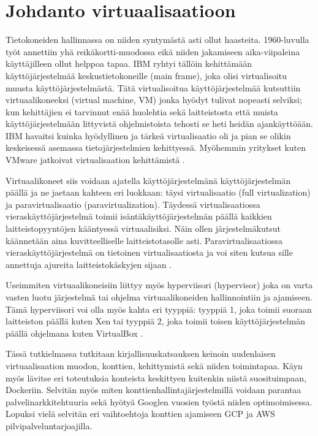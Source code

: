 \documentclass[finnish,gradu]{tktltiki3}
\begin{document}
    \section{Johdanto virtuaalisaatioon}
    
    Tietokoneiden hallinnassa on niiden syntymästä asti ollut haasteita. 1960-luvulla työt annettiin yhä reikäkortti-muodossa eikä niiden jakamiseen aika-viipaleina käyttäjilleen ollut helppoa tapaa. IBM ryhtyi tällöin kehittämään käyttöjärjestelmää keskustietokoneille (main frame), joka olisi virtualisoitu muusta käyttöjärjestelmästä. Tätä virtualisoitua käyttöjärjestelmää kutsuttiin virtuaalikoneeksi (virtual machine, VM) jonka hyödyt tulivat nopeasti selviksi; kun kehittäjien ei tarvinnut enää huolehtia sekä laitteistosta että muista käyttöjärjestelmään littyvistä ohjelmistoista tehosti se heti heidän ajankäyttöään. IBM havaitsi kuinka hyödyllinen ja tärkeä virtualisaatio oli ja pian se olikin keskeisessä asemassa tietojärjestelmien kehittyessä. Myöhemmin yritykset kuten VMware jatkoivat virtualisaation kehittämistä \cite{ibm-looks-to-future}.
    
    Virtuaalikoneet siis voidaan ajatella käyttöjärjestelmänä käyttöjärjestelmän päällä ja ne jaetaan kahteen eri luokkaan: täysi virtualisaatio (full virtualization) ja paravirtualisaatio (paravirtualization). Täydessä virtualisaatiossa vieraskäyttöjärjestelmä toimii isäntäkäyttöjärjestelmän päällä kaikkien laitteistopyyntöjen kääntyessä virtuaalisiksi. Näin ollen järjestelmäkutsut käännetään aina kuvitteelliselle laitteistotasolle asti. Paravirtualisaatiossa vieraskäyttöjärjestelmä on tietoinen virtualisaatiosta ja voi siten kutsua sille annettuja ajureita laitteistokäskyjen sijaan \cite{xen-paravirtualization}.
    
    Useimmiten virtuaalikoneisiin liittyy myös hyperviisori (hypervisor) joka on varta vasten luotu järjestelmä tai ohjelma virtuaalikoneiden hallinnointiin ja ajamiseen. Tämä hyperviisori voi olla myös kahta eri tyyppiä: tyyppiä 1, joka toimii suoraan laitteiston päällä kuten Xen tai tyyppiä 2, joka toimii toisen käyttöjärjestelmän päällä ohjelmana kuten VirtualBox \cite{hypervisor}.
    
    Tässä tutkielmassa tutkitaan kirjallisuuskatsauksen keinoin uudenlaisen virtuaalisaation muodon, konttien, kehittymistä sekä niiden toimintapaa. Käyn myös lävitse eri toteutuksia konteista keskittyen kuitenkin niistä suosituimpaan, Dockeriin. Selvitän myös miten konttienhallintajärjestelmillä voidaan parantaa palvelinarkkitehtuuria sekä hyötyä Googlen vuosien työstä niiden optimoimisessa. Lopuksi vielä selvitän eri vaihtoehtoja konttien ajamiseen GCP ja AWS pilvipalveluntarjoajilla.
    
\end{document}
